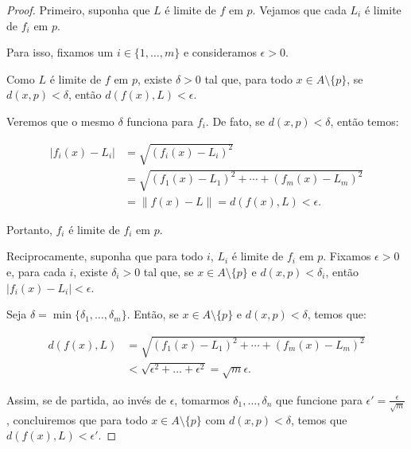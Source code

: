 \begin{proof}
    Primeiro, suponha que $L$ é limite de $f$ em $p$.
    Vejamos que cada $L_i$ é limite de $f_i$ em $p$.
    
    Para isso, fixamos um $i \in \{1, \dots, m\}$ e consideramos $\epsilon>0$.

    Como $L$ é limite de $f$ em $p$, existe $\delta>0$ tal que, para todo $x \in A\setminus\{p\}$, se $d(x, p) < \delta$, então $d(f(x), L) < \epsilon$.

    Veremos que o mesmo $\delta$ funciona para $f_i$.
    De fato, se $d(x, p) < \delta$, então temos:

    \begin{align*}
        |f_i(x) - L_i| &= \sqrt{(f_i(x) - L_i)^2} \\
        &= \sqrt{(f_1(x) - L_1)^2 + \cdots + (f_m(x) - L_m)^2} \\
        &= \|f(x) - L\| = d(f(x), L) < \epsilon.
    \end{align*}

    Portanto, $f_i$ é limite de $f_i$ em $p$.

    Reciprocamente, suponha que para todo $i$, $L_i$ é limite de $f_i$ em $p$.
    Fixamos $\epsilon>0$ e, para cada $i$, existe $\delta_i>0$ tal que, se $x \in A\setminus\{p\}$ e $d(x, p) < \delta_i$, então $|f_i(x) - L_i| < \epsilon$.

    Seja $\delta = \min\{\delta_1, \ldots, \delta_m\}$.
    Então, se $x \in A\setminus\{p\}$ e $d(x, p) < \delta$, temos que:

    \begin{align*}
        d(f(x), L) &= \sqrt{(f_1(x) - L_1)^2 + \cdots + (f_m(x) - L_m)^2} \\
        &< \sqrt{\epsilon^2+\dots+\epsilon^2}= \sqrt{m}\epsilon.
    \end{align*}

    Assim, se de partida, ao invés de $\epsilon$, tomarmos $\delta_1, \dots, \delta_n$ que funcione para $\epsilon'=\frac{\epsilon}{\sqrt{m}}$, concluiremos que para todo $x \in A\setminus\{p\}$ com $d(x, p) < \delta$, temos que $d(f(x), L) < \epsilon'$.
\end{proof}